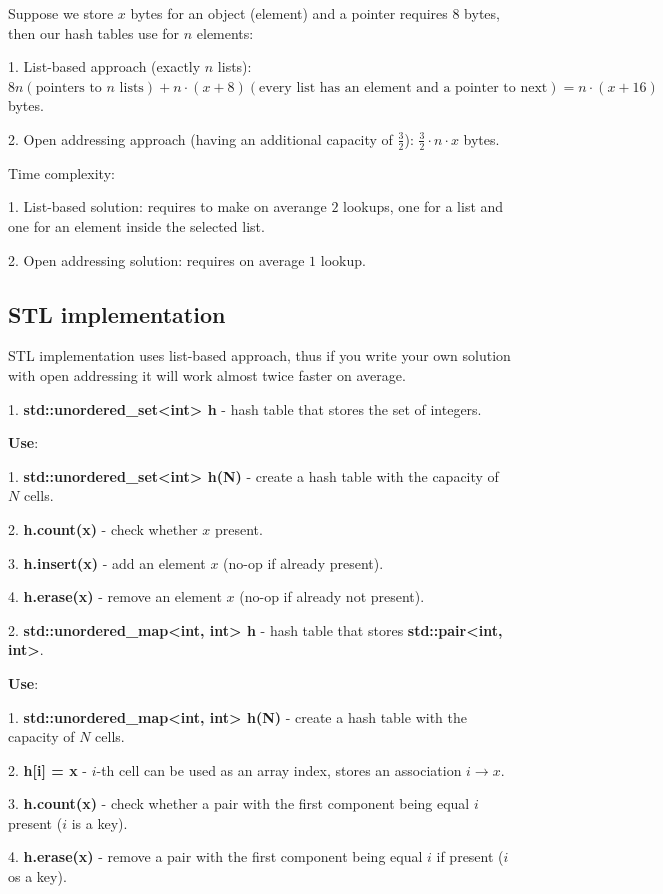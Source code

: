 Suppose we store $x$ bytes for an object (element) and a pointer requires $8$ bytes, then our hash tables use for $n$ elements:

1. List-based approach (exactly $n$ lists): $8n (\text{pointers to $n$ lists}) + n \cdot (x + 8) (\text{every list has an element and a pointer to next}) = n \cdot (x+16)$ bytes.

2. Open addressing approach (having an additional capacity of $\frac{3}{2}$): $\frac{3}{2} \cdot n \cdot x$ bytes.

Time complexity:

1. List-based solution: requires to make on averange $2$ lookups, one for a list and one for an element inside the selected list.

2. Open addressing solution: requires on average $1$ lookup.


\subsection{STL implementation}

STL implementation uses list-based approach, thus if you write your own solution with open addressing it will work almost twice faster on average.

1. \textbf{std::unordered\_set<int> h} - hash table that stores the set of integers.

\textbf{Use}:

1. \textbf{std::unordered\_set<int> h(N)} - create a hash table with the capacity of $N$ cells.

2. \textbf{h.count(x)} - check whether $x$ present.

3. \textbf{h.insert(x)} - add an element $x$ (no-op if already present).

4. \textbf{h.erase(x)} - remove an element $x$ (no-op if already not present).


2. \textbf{std::unordered\_map<int, int> h} - hash table that stores \textbf{std::pair<int, int>}.

\textbf{Use}:

1. \textbf{std::unordered\_map<int, int> h(N)} - create a hash table with the capacity of $N$ cells.

2. \textbf{h[i] = x} - $i$-th cell can be used as an array index, stores an association $i \to x$.

3. \textbf{h.count(x)} - check whether a pair with the first component being equal $i$ present ($i$ is a key).

4. \textbf{h.erase(x)} - remove a pair  with the first component being equal $i$ if present ($i$ os a key).


